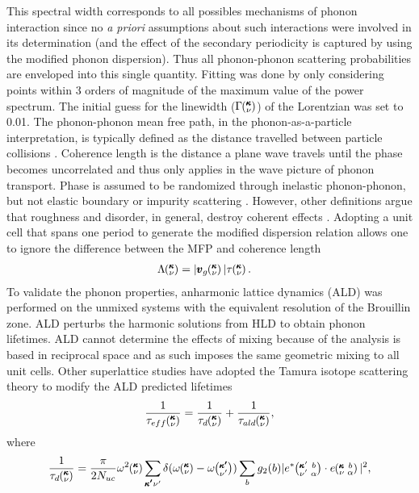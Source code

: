 \documentclass[aps,prb,preprint,preprintnumbers,amsmath,amssymb,floatfix,superscriptaddress]{revtex4}
\newcommand{\kvba}{\mspace{-4.0mu}\left(\mspace{-8.0mu}
\begin{smallmatrix} &\pmb{\kappa} &b \\ &\nu &\alpha\end{smallmatrix}
\mspace{-3.0mu}\right)}
\newcommand{\kvbap}{\mspace{-4.0mu}\left(\mspace{-8.0mu}
\begin{smallmatrix} &\pmb{\kappa}' &b \\ &\nu' &\alpha\end{smallmatrix}
\mspace{-3.0mu}\right)}
\newcommand{\kv}{\mspace{-4.0mu}\left(\mspace{-8.0mu}
\begin{smallmatrix}&\pmb{\kappa} \\&\nu\end{smallmatrix}
\mspace{-3.0mu}\right)}
\newcommand{\kvp}{\mspace{-4.0mu}\left(\mspace{-8.0mu}
\begin{smallmatrix}&\pmb{\kappa'} \\&\nu'\end{smallmatrix}
\mspace{-3.0mu}\right)}
\begin{document}
This spectral width corresponds to all possibles mechanisms of phonon interaction since no \textit{a priori} assumptions about such interactions were involved in its determination (and the effect of the secondary periodicity is captured by using the modified phonon dispersion). Thus all phonon-phonon scattering probabilities are enveloped into this single quantity. Fitting was done by only considering points within 3 orders of magnitude of the maximum value of the power spectrum. The initial guess for the linewidth ($\Gamma\kv$) of the Lorentzian was set to 0.01.
The phonon-phonon mean free path, in the phonon-as-a-particle interpretation, is typically defined as the distance travelled between particle collisions \cite{ziman_electrons_2001}. Coherence length is the distance a plane wave travels until the phase becomes uncorrelated and thus only applies in the wave picture of phonon transport. Phase is assumed to be randomized through inelastic phonon-phonon, but not elastic boundary or impurity scattering \cite{chen2005nanoscale}. However, other definitions argue that roughness and disorder, in general, destroy coherent effects \cite{PhysRevB.67.195311,dames:682}. Adopting a unit cell that spans one period to generate the modified dispersion relation allows one to ignore the difference between the MFP and coherence length
\begin{equation}\label{EQ:M:phonon_mfp}
\begin{split}
\Lambda\kv &= |\pmb{v}_{g}\kv {}| \tau\kv.
\end{split}
\end{equation}
To validate the phonon properties, anharmonic lattice dynamics \cite{PhysRevB.79.064301} (ALD) was performed on the unmixed systems with the equivalent resolution of the Brouillin zone. ALD perturbs the harmonic solutions from HLD to obtain phonon lifetimes. ALD cannot determine the effects of mixing because of the analysis is based in reciprocal space and as such imposes the same geometric mixing to all unit cells. Other superlattice studies \cite{Luckyanova16112012} have adopted the Tamura isotope scattering theory \cite{tamura_isotope_1983} to modify the ALD predicted lifetimes
\begin{equation}\label{EQ:tau_eff}
\begin{split}
\frac{1}{\tau_{eff}\kv} = \frac{1}{\tau_{d}\kv}+\frac{1}{\tau_{ald}\kv} ,
\end{split}
\end{equation}
where
\begin{equation}\label{EQ:tau_d}
\begin{split}
\frac{1}{\tau_{d}\kv} = \frac{\pi}{2N_{uc}}\omega^2\kv 
\sum_{\pmb{\kappa'}\nu'} \delta( \omega\kv - \omega\kvp )\sum_{b} g_2(b) 
|e^*\kvbap \cdot e\kvba |^2 ,
\end{split}
\end{equation}
\end{document}
